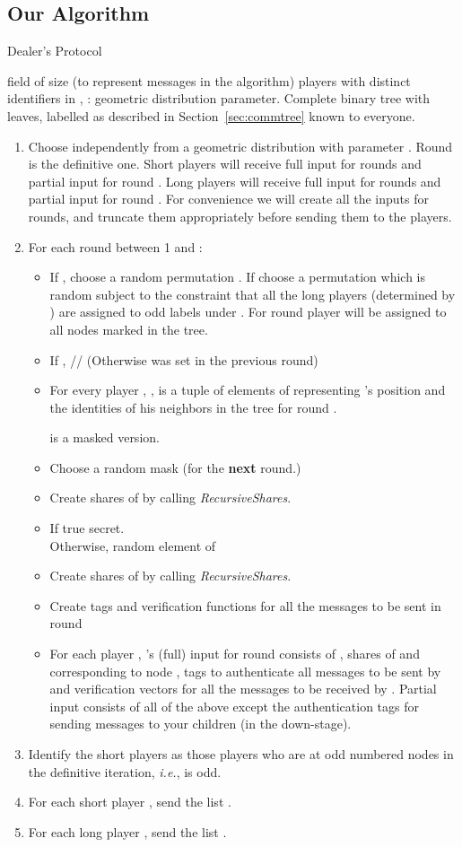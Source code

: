 \documentclass[12pt]{article}
\theoremstyle{definition}
\newcommand{\ie}{\emph{i.e.}}
\newcommand{\recursiveShares}{\emph{RecursiveShares}\xspace}
\begin{document}
\subsection{Our Algorithm}\label{sec:alg}


\begin{algorithm}
\caption{Dealer's Protocol} \label{alg:Dealer} 
 field of size  (to represent messages in the algorithm)
 players with distinct identifiers in ,
: geometric distribution parameter.
Complete binary tree with  leaves, labelled as described in 
Section~\ref{sec:commtree} known to everyone.
\begin{enumerate}
\item Choose  independently from a geometric distribution with 
parameter . Round  is the definitive one. Short players will receive 
full input for  rounds and partial input for round . Long players 
will receive full input for  rounds and partial input for round . 
For convenience we will create all the inputs for  rounds, and 
truncate them appropriately before sending them to the players.
\item For each round  between 1 and :
\begin{itemize}
\item If , choose a random permutation . 
If  choose a permutation  which is random subject to the 
constraint that all the long players (determined by ) are assigned 
to odd labels under .
For round  player  
will be assigned to all nodes marked  in the tree. 
\item If ,  // (Otherwise  was set in the previous round)
\item For every player , ,
is a tuple of elements of  representing 's position and the identities 
of his neighbors in the tree for round . 

is a masked version.
\item Choose a random mask  (for the {\bf next} round.)
\item Create shares of  by calling 
\recursiveShares.
\item If   true secret.\\
 Otherwise,  random element of 
\item Create shares of  by calling \recursiveShares.
\item Create tags and verification functions for all the messages to be 
sent in round 
\item For each player , 's (full) input  for round   
consists of , shares of  and  corresponding to node 
, tags to authenticate all messages to be sent by  and 
verification vectors for all the 
messages to be received by . Partial input  consists of 
all of the above except the authentication tags for sending messages to your 
children (in the down-stage).
\end{itemize}
\item Identify the short players as those players  who are at odd numbered 
nodes in the definitive iteration, \ie,  is odd.
\item For each short player , send  the list 
.
\item For each long player , send  the list 
.
\end{enumerate}
\end{algorithm}
\end{document}
